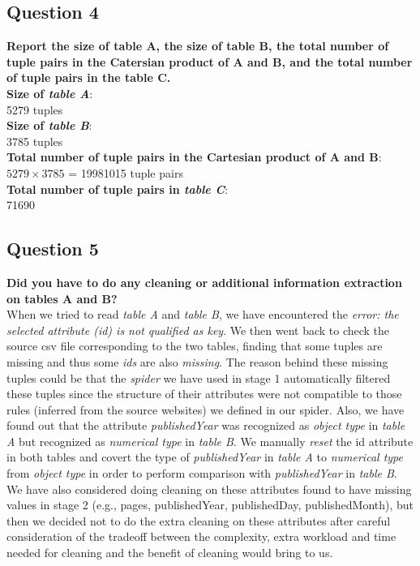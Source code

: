 \documentclass[10pt, oneside]{article}
\begin{document}
\subsection*{Question 4}
\textbf{Report the size of table A, the size of table B, the total number of tuple pairs in the Catersian product of A and B, and the total number of tuple pairs in the table C.}
\vspace{1ex}
\\
\textbf{Size of \textit{table A}}: \\5279 tuples
\vspace{0.5ex}
\\
\textbf{Size of \textit{table B}}: \\3785 tuples
\vspace{0.5ex}
\\
\textbf{Total number of tuple pairs in the \textbf{Cartesian product of A and B}}: \\$5279 \times 3785$ = 19981015 tuple pairs
\vspace{0.5ex}
\\
\textbf{Total number of tuple pairs in \textit{table C}}:
\vspace{0.5ex}
\\
71690

\subsection*{Question 5}
\textbf{Did you have to do any cleaning or additional information extraction on tables A and B?}
\vspace{1ex}
\\
When we tried to read \textit{table A} and \textit{table B}, we have encountered the \textit{error: the selected attribute (id) is not qualified as key}. We then went back to check the source csv file corresponding to the two tables, finding
that some tuples are missing and thus some \textit{ids} are also \textit{missing}. The reason behind these missing tuples could be that the \textit{spider} we have used in stage 1 automatically filtered these tuples since the structure of their attributes were not compatible to those rules (inferred from the source websites) we defined in our spider. Also, we have found out that the attribute \textit{publishedYear} was recognized as \textit{object type} in \textit{table A} but recognized as \textit{numerical type} in \textit{table B}. We manually \textit{reset} the id attribute in both tables and covert the type of \textit{publishedYear} in \textit{table A} to \textit{numerical type} from \textit{object type} in order to perform comparison with  \textit{publishedYear} in \textit{table B}. We have also considered doing cleaning on these attributes found to have missing values in stage 2 (e.g., pages, publishedYear, publishedDay, publishedMonth), but then we decided not to do the extra cleaning on these attributes after careful consideration of the tradeoff between the complexity, extra workload and time needed for cleaning and the benefit of cleaning would bring to us.
\end{document}
